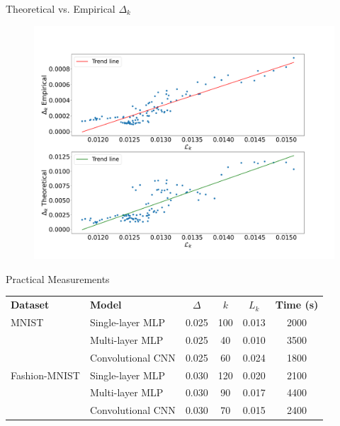 \documentclass{beamer}
\begin{document}
\begin{frame}{Theoretical vs. Empirical $\Delta_k$}
    \begin{figure}
        \centering
        \includegraphics[width=1\textwidth]{img/delta_loss_1_10_1024.pdf}
    \end{figure}
\end{frame}


\begin{frame}{Practical Measurements}
    \begin{table}
        \centering
        \small
        \begin{tabularx}{\textwidth}{|l|>{\raggedright\arraybackslash}X|c|c|c|c|}
            \hline
            \textbf{Dataset}
                          & \textbf{Model}    & \(\Delta\) & \(k\) & \(L_k\) & \textbf{Time (s)} \\
            \hhline{|=|=|=|=|=|=|}
            MNIST         & Single-layer MLP  & 0.025      & 100   & 0.013   & 2000              \\
                          & Multi-layer MLP   & 0.025      & 40    & 0.010   & 3500              \\
                          & Convolutional CNN & 0.025      & 60    & 0.024   & 1800              \\
            \hline
            Fashion-MNIST & Single-layer MLP  & 0.030      & 120   & 0.020   & 2100              \\
                          & Multi-layer MLP   & 0.030      & 90    & 0.017   & 4400              \\
                          & Convolutional CNN & 0.030      & 70    & 0.015   & 2400              \\
            \hline
        \end{tabularx}
    \end{table}
\end{frame}
\end{document}
